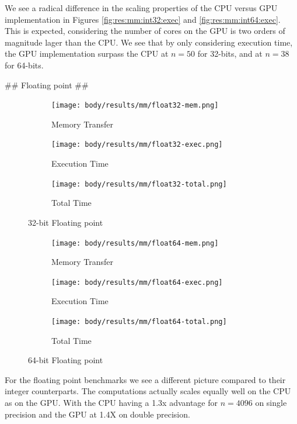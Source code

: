 \begin{markdown}
We see a radical difference in the scaling properties of the CPU
versus GPU implementation in Figures \ref{fig:res:mm:int32:exec} and
\ref{fig:res:mm:int64:exec}. This is expected, considering the number
of cores on the GPU is two orders of magnitude lager than the CPU. We
see that by only considering execution time, the GPU implementation
surpass the CPU at $n=50$ for 32-bits, and at $n=38$ for 64-bits.

## Floating point ##

\begin{figure}[H]
  \centering
  \begin{subfigure}{.33\textwidth}
    \centering
    \texttt{[image: body/results/mm/float32-mem.png]}
    \caption{Memory Transfer}
    \label{fig:res:mm:float32:mem}
  \end{subfigure}%
  \begin{subfigure}{.33\textwidth}
    \centering
    \texttt{[image: body/results/mm/float32-exec.png]}
    \caption{Execution Time}
    \label{fig:res:mm:float32:exec}
  \end{subfigure}%
  \begin{subfigure}{.33\textwidth}
    \centering
    \texttt{[image: body/results/mm/float32-total.png]}
    \caption{Total Time}
    \label{fig:res:mm:float32:tot}
  \end{subfigure}
  \caption{32-bit Floating point}
  \label{fig:res:mm:float32}
\end{figure}


\begin{figure}[H]
  \centering
  \begin{subfigure}{.33\textwidth}
    \centering
    \texttt{[image: body/results/mm/float64-mem.png]}
    \caption{Memory Transfer}
    \label{fig:res:mm:float64:mem}
  \end{subfigure}%
  \begin{subfigure}{.33\textwidth}
    \centering
    \texttt{[image: body/results/mm/float64-exec.png]}
    \caption{Execution Time}
    \label{fig:res:mm:float64:exec}
  \end{subfigure}%
  \begin{subfigure}{.33\textwidth}
    \centering
    \texttt{[image: body/results/mm/float64-total.png]}
    \caption{Total Time}
    \label{fig:res:mm:float64:tot}
  \end{subfigure}
  \caption{64-bit Floating point}
  \label{fig:res:mm:float64}
\end{figure}

For the floating point benchmarks we see a different picture compared
to their integer counterparts. The computations actually scales
equally well on the CPU as on the GPU. With the CPU having a 1.3x
advantage for $n=4096$ on single precision and the GPU at 1.4X on
double precision.


\end{markdown}

